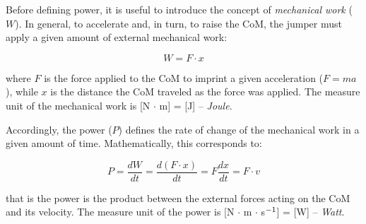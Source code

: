 Before defining power, it is useful to introduce the concept of \textit{mechanical work} ($W$). In general, to accelerate and, in turn, to raise the CoM, the jumper must apply a given amount of external mechanical work:

\begin{equation}\label{eq:work_general}
	W = F \cdot x
\end{equation}

where $F$ is the force applied to the CoM to imprint a given acceleration ($F = ma$), while $x$ is the distance the CoM traveled as the force was applied. The measure unit of the mechanical work is [N $\cdot$ m] = [J] -- \textit{Joule}.

Accordingly, the power ($P$) defines the rate of change of the mechanical work in a given amount of time. Mathematically, this corresponds to:

\begin{equation}\label{eq:power_general}
	P = \frac{dW}{dt} = \frac{d (F \cdot x)}{dt} = F \frac{dx}{dt} = F \cdot v
\end{equation}

that is the power is the product between the external forces acting on the CoM and its velocity. The measure unit of the power is [N $\cdot$ m $\cdot$ s$^{\rm{-1}}$] = [W] -- \textit{Watt}.


